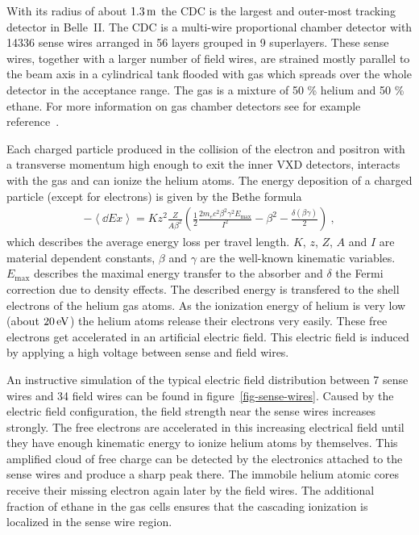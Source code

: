 With its radius of about $\unit[1.3]{m}$ the CDC is the largest and outer-most tracking detector in Belle~II. The CDC is a multi-wire proportional chamber detector with 14336 sense wires arranged in 56 layers grouped in 9 superlayers. These sense wires, together with a larger number of field wires, are strained mostly parallel to the beam axis in a cylindrical tank flooded with gas which spreads over the whole detector in the acceptance range. The gas is a mixture of 50 \% helium and 50 \% ethane. For more information on gas chamber detectors see for example reference~\cite{grupen}.

Each charged particle produced in the collision of the electron and positron with a transverse momentum high enough to exit the inner VXD detectors, interacts with the gas and can ionize the helium atoms. The energy deposition of a charged particle (except for electrons) is given by the Bethe formula~\cite{bethe}
\begin{align}
 - \left\langle \dd{E}{x} \right\rangle = K z^2 \frac{Z}{A \beta^2} \left( \frac 1 2 \frac{2 m_e c^2 \beta^2 \gamma^2 E_\text{max}}{I^2} - \beta^2 - \frac{\delta(\beta \gamma)}{2}  \right) \ , \label{form-bethe}
\end{align}
which describes the average energy loss per travel length. $K$, $z$, $Z$, $A$ and $I$ are material dependent constants, $\beta$ and $\gamma$ are the well-known kinematic variables. $E_\text{max}$ describes the maximal energy transfer to the absorber and $\delta$ the Fermi correction due to density effects. The described energy is transfered to the shell electrons of the helium gas atoms. As the ionization energy of helium is very low (about $\unit[20]{eV}$) the helium atoms release their electrons very easily. These free electrons get accelerated in an artificial electric field. This electric field is induced by applying a high voltage between sense and field wires. 

An instructive simulation of the typical electric field distribution between 7 sense wires and 34 field wires can be found in figure~\ref{fig-sense-wires}. Caused by the electric field configuration, the field strength near the sense wires increases strongly. The free electrons are accelerated in this increasing electrical field until they have enough kinematic energy to ionize helium atoms by themselves. This amplified cloud of free charge can be detected by the electronics attached to the sense wires and produce a sharp peak there. The immobile helium atomic cores receive their missing electron again later by the field wires. The additional fraction of ethane in the gas cells ensures that the cascading ionization is localized in the sense wire region.

